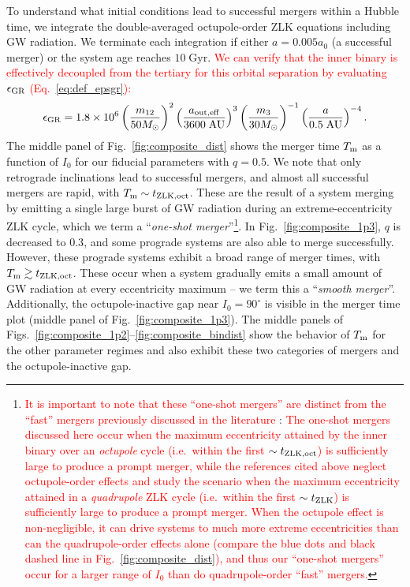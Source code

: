 \documentclass[
        fleqn,
        usenatbib,
    ]{mnras}
\newcommand*{\p}[1]{\left(#1\right)}
\begin{document}
To understand what initial conditions lead to successful mergers within a Hubble
time, we integrate the double-averaged octupole-order ZLK equations including GW
radiation. We terminate each integration if either $a = 0.005a_0$ (a successful
merger) or the system age reaches $10\;\mathrm{Gyr}$. \textcolor{red}{We can
verify that the inner binary is effectively decoupled from the tertiary for this
orbital separation by evaluating $\epsilon_{\rm GR}$ (Eq.~\ref{eq:def_epsgr}):
\begin{equation}
    \epsilon_{\rm GR} = 1.8 \times 10^6
        \p{\frac{m_{12}}{50 M_{\odot}}}^2
        \p{\frac{a_{\rm out, eff}}{3600\;\mathrm{AU}}}^3
        \p{\frac{m_3}{30M_{\odot}}}^{-1}
        \p{\frac{a}{0.5\;\mathrm{AU}}}^{-4}.
        \label{eq:epsgr_0005}
\end{equation}}
The middle panel of Fig.~\ref{fig:composite_dist} shows the merger time $T_{\rm
m}$ as a function of $I_0$ for our fiducial parameters with $q = 0.5$. We note
that only retrograde inclinations lead to successful mergers, and almost all
successful mergers are rapid, with $T_{\rm m} \sim t_{\rm ZLK, oct}$. These are
the result of a system merging by emitting a single large burst of GW radiation
during an extreme-eccentricity ZLK cycle, which we term a ``\emph{one-shot
merger}''\footnote{\textcolor{red}{It is important to note that these ``one-shot
mergers'' are distinct from the ``fast'' mergers previously discussed in the
literature} \citep[e.g.][]{wen2003eccentricity, randall2018analytical,
su2020spin}: \textcolor{red}{The one-shot mergers discussed here occur when the
maximum eccentricity attained by the inner binary over an \emph{octupole} cycle
(i.e.\ within the first $\sim t_{\rm ZLK, oct}$) is sufficiently large to
produce a prompt merger, while the references cited above neglect octupole-order
effects and study the scenario when the maximum eccentricity attained in a
\emph{quadrupole} ZLK cycle (i.e.\ within the first $\sim t_{\rm ZLK}$) is
sufficiently large to produce a prompt merger. When the octupole effect is
non-negligible, it can drive systems to much more extreme eccentricities than
can the quadrupole-order effects alone (compare the blue dots and black dashed
line in Fig.~\ref{fig:composite_dist}), and thus our ``one-shot mergers'' occur
for a larger range of $I_0$ than do quadrupole-order ``fast'' mergers.}}. In
Fig.~\ref{fig:composite_1p3}, $q$ is decreased to $0.3$, and some prograde
systems are also able to merge successfully. However, these prograde systems
exhibit a broad range of merger times, with $T_{\rm m} \gtrsim t_{\rm ZLK,
oct}$. These occur when a system gradually emits a small amount of GW radiation
at every eccentricity maximum -- we term this a %
``\emph{smooth merger}''. Additionally, the octupole-inactive gap near $I_0 =
90^\circ$ is visible in the merger time plot (middle panel of
Fig.~\ref{fig:composite_1p3}). The middle panels of
Figs.~\ref{fig:composite_1p2}--\ref{fig:composite_bindist} show the behavior of
$T_{\rm m}$ for the other parameter regimes and also exhibit these two
categories of mergers and the octupole-inactive gap.
\end{document}
